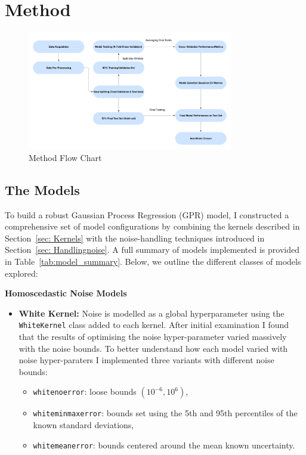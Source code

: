 \documentclass[10pt]{article}
\begin{document}
\section{Method}
\begin{figure}[H]
    \centering
   \includegraphics[width=0.8\textwidth]{LatexPlots/Flowchart.png}
    \caption{Method Flow Chart}
    \label{fig:flowchart}
\end{figure}
\subsection{The Models}
\label{subsec:Models}
To build a robust Gaussian Process Regression (GPR) model, I constructed a comprehensive set of model configurations by combining the kernels described in Section~\ref{sec: Kernels} with the noise-handling techniques introduced in Section~\ref{sec: Handlingnoise}. 
A full summary of models implemented is provided in Table~\ref{tab:model_summary}. Below, we outline the different classes of models explored:

\noindent
\textbf{Homoscedastic Noise Models}
\begin{itemize}
    \item \textbf{White Kernel:} Noise is modelled as a global hyperparameter using the \texttt{WhiteKernel} class added to each kernel.
    After initial examination I found that the results of optimising the noise hyper-parameter varied massively with the noise bounds. 
    To better understand how each model varied with noise hyper-paraters I implemented three variants with different noise bounds:
    \begin{itemize}
        \item \texttt{whitenoerror}: loose bounds \((10^{-6}, 10^6)\),
        \item \texttt{whiteminmaxerror}: bounds set using the 5th and 95th percentiles of the known standard deviations,
        \item \texttt{whitemeanerror}: bounds centered around the mean known uncertainty.
    \end{itemize}
\end{itemize}
%
%
\end{document}
